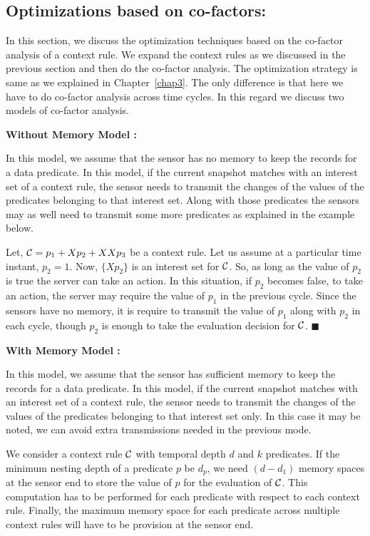 \subsection{Optimizations based on co-factors:}
\noindent
In this section, we discuss the optimization techniques based on the co-factor analysis of a context rule. 
We expand the context rules as we discussed in the previous section and then do the co-factor analysis.
The optimization strategy is same as we explained in Chapter~\ref{chap3}.
The only difference is that here we have to do co-factor analysis across time cycles.
In this regard we discuss two models of co-factor analysis.

\noindent
{\bf{Without Memory Model : }}

\noindent
In this model, we assume that the sensor has no memory to keep the records for a data predicate.
In this model, if the current snapshot matches with an interest set of a context rule, the sensor needs to 
transmit the changes of the values of the predicates belonging to that interest set. Along with those predicates the
sensors may as well need to transmit some more predicates as explained in the example below.

\begin{example}
 Let, ${\cal{C}} = p_1 + Xp_2 + XXp_3$ be a context rule. Let us assume at a particular time instant, $p_2 = 1$. Now,
 $\{Xp_2\}$ is an interest set for $\cal{C}$. So, as long as the value of $p_2$ is true the server can take an action. 
 In this situation, if $p_2$ becomes false, to take an action, the server may
 require the value of $p_1$ in the previous cycle. Since the sensors have no memory, it is require to 
 transmit the value of $p_1$ along with $p_2$ in each cycle, though $p_2$ is enough to take the evaluation decision for ${\cal{C}}$.
 \hfill$\blacksquare$
\end{example}


\noindent
{\bf{With Memory Model : }}

\noindent
In this model, we assume that the sensor has sufficient memory to keep the records for a data predicate.
In this model, if the current snapshot matches with an interest set of a context rule, the sensor needs to 
transmit the changes of the values of the predicates belonging to that interest set only. In this case it may be noted,
we can avoid extra transmissions needed in the previous mode.

\noindent
We consider a context rule $\cal{C}$ with temporal depth $d$ and $k$ predicates.
If the minimum nesting depth of a predicate $p$ be $d_p$, we need
$(d - d_1)$ memory spaces at the sensor end to store the value of $p$ for the evaluation of $\cal{C}$.
This computation has to be performed for each predicate with respect to each context rule. Finally, the maximum 
memory space for each predicate across multiple context rules will have to be provision at the sensor end.


